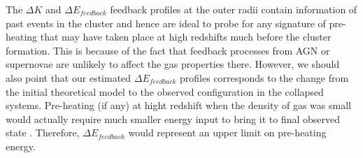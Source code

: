 \documentclass[a4paper,fleqn,usenatbib]{mnras}
\begin{document}
The $\Delta K$ and $\Delta E_{feedback}$ feedback profiles at the outer radii contain information of past events in the cluster and hence are ideal to probe for any signature of pre-heating that may have taken place at high redshifts much before the cluster formation. This is because  of the fact that feedback processes from AGN or supernovae are unlikely to affect the gas properties there. However, we should also point that our estimated $\Delta E_{feedback}$ profiles corresponds to the change from the initial theoretical model to the observed configuration in the collapsed systems. Pre-heating (if any) at hight redshift when the  density of gas was small  would actually require much smaller energy input to bring it to final observed state \citep{McCarthy2008}. Therefore, $\Delta E_{feedback}$ would represent an upper limit on pre-heating energy. 
\end{document}
